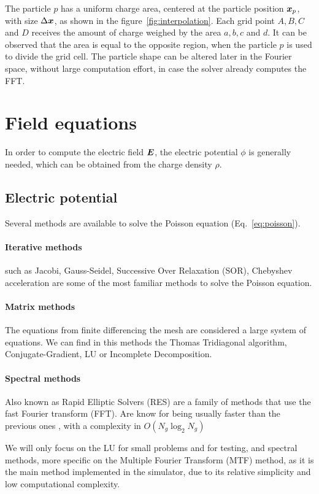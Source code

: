 %
The particle $p$ has a uniform charge area, centered at the particle position 
$\bm{x}_p$, with size $\Delta \bm{x}$, as shown in the figure~\ref{fig:interpolation}.  
Each grid point $A,B,C$ and $D$ receives the amount of charge weighed by the 
area $a,b,c$ and $d$. It can be observed that the area is equal to the opposite 
region, when the particle $p$ is used to divide the grid cell.
%
The particle shape can be altered later in the Fourier space, without large 
computation effort, in case the solver already computes the FFT.
%
\section{Field equations}

In order to compute the electric field $\bm{E}$, the electric potential $\phi$ is 
generally needed, which can be obtained from the charge density $\rho$.

\subsection{Electric potential}
Several methods are available to solve the Poisson equation 
(Eq.~\ref{eq:poisson}).

\paragraph{Iterative  methods} such as Jacobi, Gauss-Seidel, Successive Over 
Relaxation (SOR), Chebyshev acceleration are some of the most familiar methods 
to solve the Poisson equation.

\paragraph{Matrix methods} The equations from finite differencing the mesh are 
considered a large system of equations. We can find in this methods the Thomas 
Tridiagonal algorithm, Conjugate-Gradient, LU or Incomplete Decomposition.

\paragraph{Spectral methods} Also known as Rapid Elliptic Solvers (RES) are a 
family of methods that use the fast Fourier transform (FFT). Are know for being 
usually faster than the previous ones \cite{recipes}, with a complexity in 
$O(N_g \log_2 N_g)$

\vspace{1em}
\noindent
%
We will only focus on the LU for small problems and for testing, and spectral 
methods, more specific on the Multiple Fourier Transform (MTF) method, as it is 
the main method implemented in the simulator, due to its relative simplicity and 
low computational complexity.

